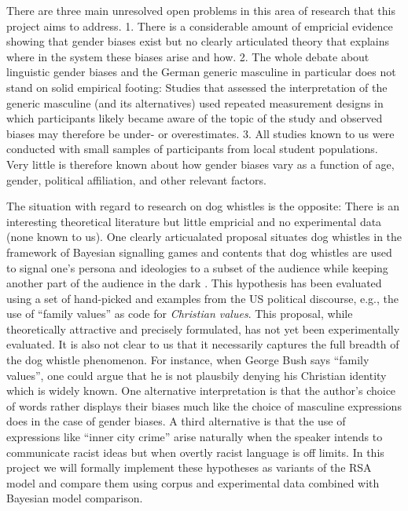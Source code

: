 \documentclass[11pt]{article}
\begin{document}
There are three main unresolved open problems in this area of research that this project aims to address.  1. There is a considerable amount of empricial evidence showing that gender biases exist but no clearly articulated theory that explains where in the system these biases arise and how.  2. The whole debate about linguistic gender biases and the German generic masculine in particular does not stand on solid empirical footing:  Studies that assessed the interpretation of the generic masculine (and its alternatives) used repeated measurement designs in which participants likely became aware of the topic of the study and observed biases may therefore be under- or overestimates.  3. All studies known to us were conducted with small samples of participants from local student populations.  Very little is therefore known about how gender biases vary as a function of age, gender, political affiliation, and other relevant factors.  

The situation with regard to research on dog whistles is the opposite: There is an interesting theoretical literature but little empricial and no experimental data (none known to us).  One clearly articualated proposal situates dog whistles in the framework of Bayesian signalling games \parencite{Burnett2017} and contents that dog whistles are used to signal one’s persona and ideologies to a subset of the audience while keeping another part of the audience in the dark \parencite{HendersonMcCready2018, HendersonMcCready2019}.  This hypothesis has been evaluated using a set of hand-picked and examples from the US political discourse, e.g., the use of “family values” as code for \textit{Christian values}.  This proposal, while theoretically attractive and precisely formulated, has not yet been experimentally evaluated.  It is also not clear to us that it necessarily captures the full breadth of the dog whistle phenomenon.  For instance, when George Bush says “family values”, one could argue that he is not plausbily denying  his Christian identity which is widely known.  One alternative interpretation is that the author’s choice of words rather displays their biases much like the choice of masculine expressions does in the case of gender biases.  A third alternative is that the use of expressions like “inner city crime” arise naturally when the speaker intends to communicate racist ideas but when overtly racist language is off limits.  In this project we will formally implement these hypotheses as variants of the RSA model and compare them using corpus and experimental data combined with Bayesian model comparison.
\end{document}
